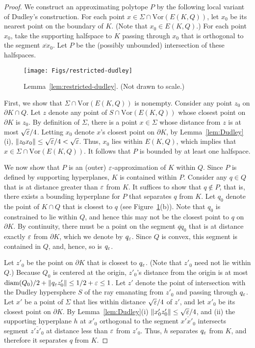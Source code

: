\documentclass[11pt]{article}   \usepackage[letterpaper,hmargin=2.1cm,vmargin=3cm]{geometry}
\newcommand{\diam}{\mathrm{diam}}
\newcommand{\Vor}{\mathrm{Vor}}
\begin{document}
\begin{proof}
We construct an approximating polytope $P$ by the following local variant of Dudley's construction. For each point $x \in \Sigma \cap \Vor(E(K,Q))$, let $x_0$ be its nearest point on the boundary of $K$. (Note that $x_0 \in E(K,Q)$.) For each point $x_0$, take the supporting halfspace to $K$ passing through $x_0$ that is orthogonal to the segment $\overline{x x}_0$. Let $P$ be the (possibly unbounded) intersection of these halfspaces.

\begin{figure}[htbp]
  \centerline{\texttt{[image: Figs/restricted-dudley]}}
  \caption{Lemma~\ref{lem:restricted-dudley}. (Not drawn to scale.)}
  \label{fig:restricted-dudley}
\end{figure}


First, we show that $\Sigma \cap \Vor(E(K,Q))$ is nonempty. Consider any point $z_0$ on $\partial K \cap Q$. Let $z$ denote any point of $S \cap \Vor(E(K,Q))$ whose closest point on $\partial K$ is $z_0$. By definition of $\Sigma$, there is a point $x \in \Sigma$ whose distance from $z$ is at most $\sqrt{\varepsilon}/4$. Letting $x_0$ denote $x$'s closest point on $\partial K$, by Lemma~\ref{lem:Dudley}(i), $\|z_0 x_0\| \le \sqrt{\varepsilon}/4 < \sqrt{\varepsilon}$. Thus, $x_0$ lies within $E(K,Q)$, which implies that $x \in \Sigma \cap \Vor(E(K,Q))$. It follows that $P$ is bounded by at least one halfspace.


We now show that $P$ is an (outer) $\varepsilon$-approximation of $K$ within $Q$. Since $P$ is defined by supporting hyperplanes, $K$ is contained within $P$. Consider any $q \in Q$ that is at distance greater than $\varepsilon$ from $K$. It suffices to show that $q \notin P$, that is, there exists a bounding hyperplane for $P$ that separates $q$ from $K$. Let $q_0$ denote the point of $K \cap Q$ that is closest to $q$ (see Figure~\ref{fig:restricted-dudley}(b)). Note that $q_0$ is constrained to lie within $Q$, and hence this may not be the closest point to $q$ on $\partial K$. By continuity, there must be a point on the segment $\overline{q q}_0$ that is at distance exactly $\varepsilon$ from $\partial K$, which we denote by $q_{\varepsilon}$. Since $Q$ is convex, this segment is contained in $Q$, and, hence, so is $q_{\varepsilon}$. 

Let $z'_0$ be the point on $\partial K$ that is closest to $q_{\varepsilon}$. (Note that $z'_0$ need not lie within $Q$.) Because $Q_0$ is centered at the origin, $z'_0$'s distance from the origin is at most $\diam(Q_0)/2 + \|q_{\eps} z'_0\| \le 1/2 + \eps \le 1$. Let $z'$ denote the point of intersection with the Dudley hypersphere $S$ of the ray emanating from $z'_0$ and passing through $q_{\varepsilon}$. Let $x'$ be a point of $\Sigma$ that lies within distance $\sqrt{\varepsilon} / 4$ of $z'$, and let $x'_0$ be its closest point on $\partial K$. By Lemma~\ref{lem:Dudley}(i) $\|x'_0 z'_0\| \le \sqrt{\varepsilon} / 4$, and (ii) the supporting hyperplane $h$ at $x'_0$ orthogonal to the segment $\overline{x' x'_0}$ intersects segment $\overline{z' z'_0}$ at distance less than $\varepsilon$ from $z'_0$. Thus, $h$ separates $q_{\varepsilon}$ from $K$, and therefore it separates $q$ from $K$.


\end{proof}
\end{document}
